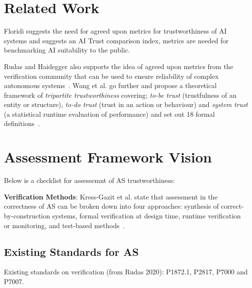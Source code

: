 \section{Related Work}\label{Related_work}

Floridi suggests the need for agreed upon metrics for trustworthiness of AI systems and suggests an  AI Trust comparison index, metrics are needed for benchmarking AI suitability to the public.

Rudas and Haidegger also supports the idea of agreed upon metrics from the verification community that can be used to ensure reliability of complex autonomous systems~\cite{Rudas2020}. Wang et al. go further and propose a  theoretical framework of \emph{tripartite trustworthiness} covering; \emph{to-be trust} (trustfulness of an entity or structure), \emph{to-do trust} (trust in an action or behaviour) and \emph{system trust} (a statistical runtime evaluation of performance) and set out 18 formal definitions~\cite{Wang2020}. 



\section{Assessment Framework Vision}\label{Assessment_Framework_Vision}


Below is a checklist for assessemnt of AS trustworthiness:





\noindent\textbf{Verification Methods}: %
Kress-Gazit et al. state that assessment in the correctness of AS can be broken down into four approaches: synthesis of correct-by-construction systems, formal verification at design time, runtime verification or monitoring, and test-based methods~\cite{kress2021formalizing}. 







\subsection{Existing Standards for AS}
Existing standards on verification (from Rudas 2020): P1872.1, P2817, P7000 and P7007.

